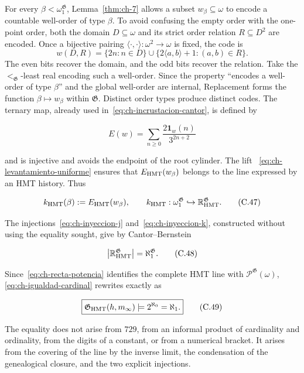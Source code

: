 For every \(\beta<\omega_1^{\mathfrak G}\), Lemma~\ref{thm:ch-7} allows a subset
\(w_\beta\subseteq\omega\) to encode a countable well-order of type
\(\beta\). To avoid confusing the empty order with the
one-point order, both the domain \(D\subseteq\omega\) and its strict order
relation \(R\subseteq D^2\) are encoded. Once a bijective pairing
\(\langle\cdot,\cdot\rangle:\omega^2\to\omega\) is fixed, the code is
\[
 w(D,R)=\{2n:n\in D\}\cup
        \{2\langle a,b\rangle+1:(a,b)\in R\}.
\]
The even bits recover the domain, and the odd bits recover the relation. Take
the \(<_{\mathfrak G}\)-least real encoding such a well-order. Since the
property “encodes a well-order of type \(\beta\)” and the global well-order are
internal, Replacement forms the function \(\beta\mapsto w_\beta\) within
\(\mathfrak G\). Distinct order types produce distinct codes. The ternary map,
already used in~\eqref{eq:ch-incrustacion-cantor}, is defined by

\[
 E(w)=\sum_{n\ge0}\frac{2\mathbf1_w(n)}{3^{2n+2}}
\tag{C.46}\label{eq:ch-incrustacion-ternaria}
\]

and is injective and avoids the endpoint of the root cylinder. The lift
~\eqref{eq:ch-levantamiento-uniforme} ensures that
\(E_{\rm HMT}(w_\beta)\) belongs to the line expressed by an HMT history. Thus

\[
 k_{\rm HMT}(\beta):=E_{\rm HMT}(w_\beta),
 \qquad
 k_{\rm HMT}:\omega_1^{\mathfrak G}
 \hookrightarrow\mathbb R_{\rm HMT}^{\mathfrak G}.
\tag{C.47}\label{eq:ch-inyeccion-k}
\]

The injections~\eqref{eq:ch-inyeccion-j} and~\eqref{eq:ch-inyeccion-k},
constructed without using the equality sought, give by Cantor--Bernstein

\[
 \bigl|\mathbb R_{\rm HMT}^{\mathfrak G}\bigr|
 =\aleph_1^{\mathfrak G}.
\tag{C.48}\label{eq:ch-igualdad-cardinal}
\]

Since~\eqref{eq:ch-recta-potencia} identifies the complete HMT line with
\(\mathcal P^{\mathfrak G}(\omega)\), \eqref{eq:ch-igualdad-cardinal} rewrites
exactly as

\[
 \boxed{
  \mathfrak G_{\rm HMT}(h,m_\infty)
  \models 2^{\aleph_0}=\aleph_1.}
\tag{C.49}\label{eq:ch-decision}
\]

The equality does not arise from \(729\), from an informal product of
cardinality and ordinality, from the digits of a constant, or from a numerical
bracket. It arises from the covering of the line by the inverse limit, the
condensation of the genealogical closure, and the two explicit injections.

